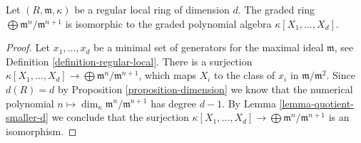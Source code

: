 \begin{lemma}
\label{lemma-regular-graded}
Let $(R, \mathfrak m, \kappa)$ be a regular local ring of dimension $d$.
The graded ring $\bigoplus \mathfrak m^n / \mathfrak m^{n + 1}$
is isomorphic to the graded polynomial algebra
$\kappa[X_1, \ldots, X_d]$.
\end{lemma}

\begin{proof}
Let $x_1, \ldots, x_d$ be a minimal set of generators
for the maximal ideal $\mathfrak m$, see
Definition \ref{definition-regular-local}.
There is a surjection $\kappa[X_1, \ldots, X_d]
\to \bigoplus \mathfrak m^n/\mathfrak m^{n + 1}$,
which maps $X_i$ to the class of $x_i$ in $\mathfrak m/\mathfrak m^2$.
Since $d(R) = d$ by
Proposition \ref{proposition-dimension}
we know that the numerical
polynomial $n \mapsto \dim_\kappa \mathfrak m^n/\mathfrak m^{n + 1}$
has degree $d - 1$. By Lemma \ref{lemma-quotient-smaller-d} we
conclude that the surjection $\kappa[X_1, \ldots, X_d]
\to \bigoplus \mathfrak m^n/\mathfrak m^{n + 1}$ is an isomorphism.
\end{proof}
